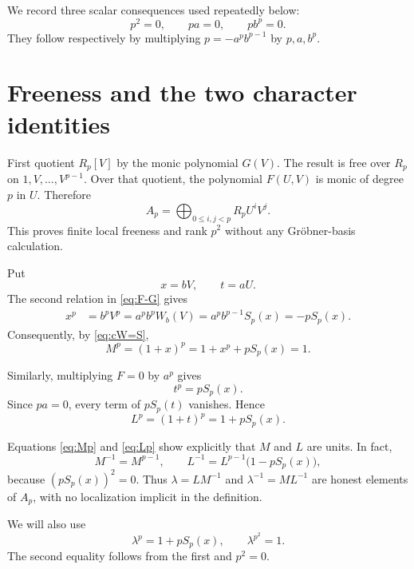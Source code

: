 \documentclass[11pt]{amsart}
\theoremstyle{definition}
\theoremstyle{remark}
\begin{document}
We record three scalar consequences used repeatedly below:
\begin{equation}\label{eq:scalar-zeroes}
 p^2=0,\qquad pa=0,\qquad pb^p=0.
\end{equation}
They follow respectively by multiplying
\(p=-a^pb^{p-1}\) by \(p,a,b^p\).

\section{Freeness and the two character identities}

First quotient \(R_p[V]\) by the monic polynomial \(G(V)\).  The result
is free over \(R_p\) on \(1,V,\ldots,V^{p-1}\).  Over that quotient,
the polynomial \(F(U,V)\) is monic of degree \(p\) in \(U\).  Therefore
\begin{equation}\label{eq:basis}
 A_p=\bigoplus_{0\leq i,j<p}R_pU^iV^j.
\end{equation}
This proves finite local freeness and rank \(p^2\) without any
Gr\"obner-basis calculation.

Put
\[
 x=bV,\qquad t=aU.
\]
The second relation in \eqref{eq:F-G} gives
\begin{align*}
 x^p
 &=b^pV^p
 =a^pb^pW_b(V)
 =a^pb^{p-1}S_p(x)
 =-pS_p(x).
\end{align*}
Consequently, by \eqref{eq:cW=S},
\begin{equation}\label{eq:Mp}
 M^p=(1+x)^p=1+x^p+pS_p(x)=1.
\end{equation}

Similarly, multiplying \(F=0\) by \(a^p\) gives
\begin{equation}\label{eq:tp}
 t^p=pS_p(x).
\end{equation}
Since \(pa=0\), every term of \(pS_p(t)\) vanishes.  Hence
\begin{equation}\label{eq:Lp}
 L^p=(1+t)^p=1+pS_p(x).
\end{equation}

Equations \eqref{eq:Mp} and \eqref{eq:Lp} show explicitly that \(M\)
and \(L\) are units.  In fact,
\begin{equation}\label{eq:explicit-inverses}
 M^{-1}=M^{p-1},
 \qquad
 L^{-1}=L^{p-1}\bigl(1-pS_p(x)\bigr),
\end{equation}
because \((pS_p(x))^2=0\).  Thus \(\lambda=LM^{-1}\) and
\(\lambda^{-1}=ML^{-1}\) are honest elements of \(A_p\), with no
localization implicit in the definition.

We will also use
\begin{equation}\label{eq:lambdap}
 \lambda^p=1+pS_p(x),
 \qquad
 \lambda^{p^2}=1.
\end{equation}
The second equality follows from the first and \(p^2=0\).
\end{document}
